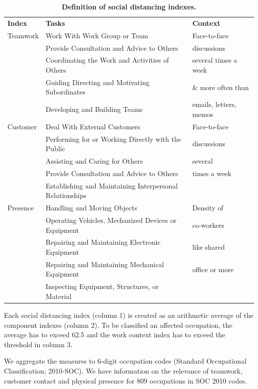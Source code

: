\begin{table}[!ht]
\caption{
{\bf Definition of social distancing indexes.}}
\begin{tabular}{|l|l|l|}
\hline
{\bf Index} & {\bf Tasks} & {\bf Context} 
\\ \thickhline
\hline
Teamwork & Work With Work Group or Team & Face-to-face  \\
& Provide Consultation and Advice to Others & discussions  \\
& Coordinating the Work and Activities of Others & several times a week \\
& Guiding Directing and Motivating Subordinates & \& more often than \\
& Developing and Building Teams & emails, letters, memos\\
\hline
Customer & Deal With External Customers & Face-to-face\\
&  Performing for or Working Directly with the Public & discussions \\
& Assisting and Caring for Others & several \\
& Provide Consultation and Advice to Others & times a week\\
& Establishing and Maintaining Interpersonal Relationships &\\
\hline
Presence & Handling and Moving Objects & Density of \\
& Operating Vehicles, Mechanized Devices or Equipment & co-workers \\
& Repairing and Maintaining Electronic Equipment &  like shared\\
& Repairing and Maintaining Mechanical Equipment & office or more\\
& Inspecting Equipment, Structures, or Material &\\
\hline
\hline
\end{tabular}
\begin{flushleft} Each social distancing index (column 1) is created as an arithmetic average of the component indexes (column 2). To be classified an affected occupation, the average has to exceed 62.5 and the work context index has to exceed the threshold in column 3.
\end{flushleft}
\label{table1}
\end{table}

We aggregate the measures to 6-digit occupation codes (Standard Occupational Classification; 2010-SOC). We have information on the relevance of teamwork, customer contact and physical presence  for 809 occupations in SOC 2010 codes.

